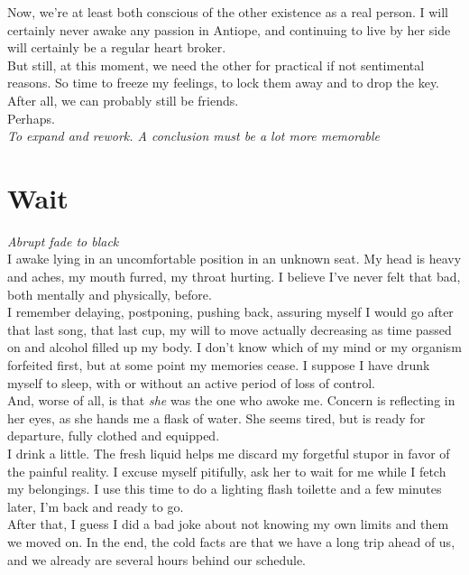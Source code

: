 \documentclass{report}
\newcommand{\dcomment}[1]{
	\emph{#1}
	\\
}
\newcommand{\gsection}[1]{
	\section*{#1}
	\label{#1}
}
\begin{document}
Now, we're at least both conscious of the other existence as a real person. I will certainly never awake any passion in Antiope, and continuing to live by her side will certainly be a regular heart broker.\\

But still, at this moment, we need the other for practical if not sentimental reasons. So time to freeze my feelings, to lock them away and to drop the key.\\

After all, we can probably still be friends.\\

Perhaps.\\

\dcomment{
	To expand and rework. A conclusion must be a lot more memorable
}

\gsection{Wait}

\dcomment{
	Abrupt fade to black
}

I awake lying in an uncomfortable position in an unknown seat. My head is heavy and aches, my mouth furred, my throat hurting. I believe I've never felt that bad, both mentally and physically, before.\\

I remember delaying, postponing, pushing back, assuring myself I would go after that last song, that last cup, my will to move actually decreasing as time passed on and alcohol filled up my body. I don't know which of my mind or my organism forfeited first, but at some point my memories cease. I suppose I have drunk myself to sleep, with or without an active period of loss of control.\\

And, worse of all, is that \emph{she} was the one who awoke me. Concern is reflecting in her eyes, as she hands me a flask of water. She seems tired, but is ready for departure, fully clothed and equipped.\\

I drink a little. The fresh liquid helps me discard my forgetful stupor in favor of the painful reality. I excuse myself pitifully, ask her to wait for me while I fetch my belongings. I use this time to do a lighting flash toilette and a few minutes later, I'm back and ready to go.\\

After that, I guess I did a bad joke about not knowing my own limits and them we moved on. In the end, the cold facts are that we have a long trip ahead of us, and we already are several hours behind our schedule.\\
\end{document}
